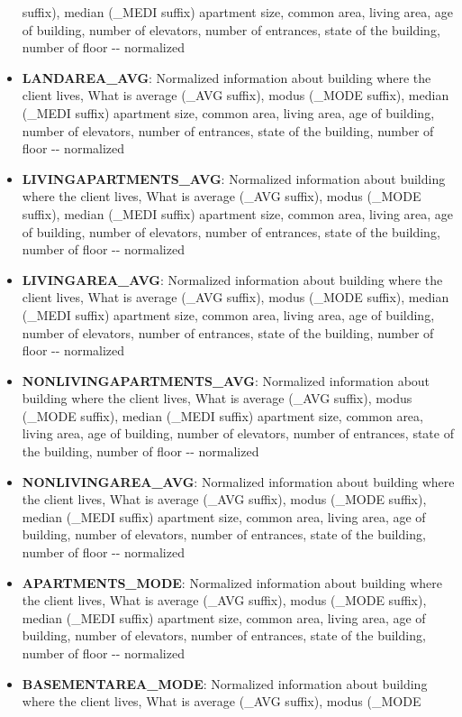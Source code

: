 \documentclass[11pt]{article}
\begin{document}
\begin{itemize}
  suffix), median (\_MEDI suffix) apartment size, common area, living
  area, age of building, number of elevators, number of entrances, state
  of the building, number of floor -\/- normalized
\item
  \textbf{LANDAREA\_AVG}: Normalized information about building where
  the client lives, What is average (\_AVG suffix), modus (\_MODE
  suffix), median (\_MEDI suffix) apartment size, common area, living
  area, age of building, number of elevators, number of entrances, state
  of the building, number of floor -\/- normalized
\item
  \textbf{LIVINGAPARTMENTS\_AVG}: Normalized information about building
  where the client lives, What is average (\_AVG suffix), modus (\_MODE
  suffix), median (\_MEDI suffix) apartment size, common area, living
  area, age of building, number of elevators, number of entrances, state
  of the building, number of floor -\/- normalized
\item
  \textbf{LIVINGAREA\_AVG}: Normalized information about building where
  the client lives, What is average (\_AVG suffix), modus (\_MODE
  suffix), median (\_MEDI suffix) apartment size, common area, living
  area, age of building, number of elevators, number of entrances, state
  of the building, number of floor -\/- normalized
\item
  \textbf{NONLIVINGAPARTMENTS\_AVG}: Normalized information about
  building where the client lives, What is average (\_AVG suffix), modus
  (\_MODE suffix), median (\_MEDI suffix) apartment size, common area,
  living area, age of building, number of elevators, number of
  entrances, state of the building, number of floor -\/- normalized
\item
  \textbf{NONLIVINGAREA\_AVG}: Normalized information about building
  where the client lives, What is average (\_AVG suffix), modus (\_MODE
  suffix), median (\_MEDI suffix) apartment size, common area, living
  area, age of building, number of elevators, number of entrances, state
  of the building, number of floor -\/- normalized
\item
  \textbf{APARTMENTS\_MODE}: Normalized information about building where
  the client lives, What is average (\_AVG suffix), modus (\_MODE
  suffix), median (\_MEDI suffix) apartment size, common area, living
  area, age of building, number of elevators, number of entrances, state
  of the building, number of floor -\/- normalized
\item
  \textbf{BASEMENTAREA\_MODE}: Normalized information about building
  where the client lives, What is average (\_AVG suffix), modus (\_MODE

\end{itemize}
\end{document}

